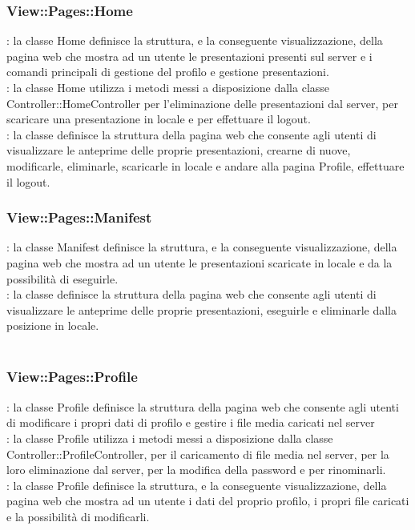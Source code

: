 {{		\subsubsection{View::Pages::Home}{
			\textbf{\tipo}: la classe Home definisce la struttura, e la conseguente visualizzazione, della pagina web che mostra ad un utente le presentazioni presenti sul server e i comandi principali di gestione del profilo e gestione presentazioni.\\	
			\textbf{\relaz}: la classe Home utilizza i metodi messi a disposizione dalla classe Controller::HomeController per l'eliminazione delle presentazioni dal server, per scaricare una presentazione in locale e per effettuare il logout.\\
			\textbf{\attivita}: la classe definisce la struttura della pagina web che consente agli utenti di visualizzare le anteprime delle proprie presentazioni, crearne di nuove, modificarle, eliminarle, scaricarle in locale e andare alla pagina Profile, effettuare il logout.\\
		}
		\subsubsection{View::Pages::Manifest}{
			\textbf{\tipo}: la classe Manifest definisce la struttura, e la conseguente visualizzazione, della pagina web che mostra ad un utente le presentazioni scaricate in locale e da la possibilità di eseguirle.\\
			\textbf{\attivita}: la classe definisce la struttura della pagina web che consente agli utenti di visualizzare le anteprime delle proprie presentazioni, eseguirle e eliminarle dalla posizione in locale.\\\\
		}
		\subsubsection{View::Pages::Profile}{
			\textbf{\tipo}: la classe Profile definisce la struttura della pagina web che consente agli utenti di modificare i propri dati di profilo e gestire i file media caricati nel server \\
			\textbf{\relaz}: la classe Profile utilizza i metodi messi a disposizione dalla classe Controller::ProfileController, per il caricamento di file media nel server, per la loro eliminazione dal server, per la modifica della password e per rinominarli.\\
			\textbf{\attivita}: la classe Profile definisce la struttura, e la conseguente visualizzazione, della pagina web che mostra ad un utente i dati del proprio profilo, i propri file caricati e la possibilità di modificarli.\\
		}
}}
